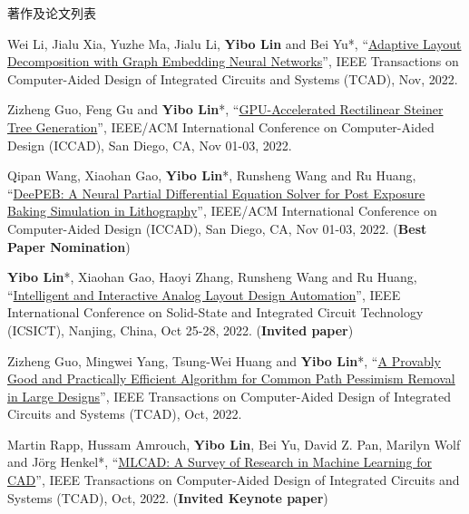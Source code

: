 \begin{rSection}{著作及论文列表}
\begin{description}[font=\normalfont, rightmargin=2em]
{}
            

\item[{[J105]}]{
        Wei Li, Jialu Xia, Yuzhe Ma, Jialu Li, \textbf{Yibo Lin} and Bei Yu*, 
    ``\href{https://doi.org/10.1109/TCAD.2022.3140729}{Adaptive Layout Decomposition with Graph Embedding Neural Networks}'', 
    IEEE Transactions on Computer-Aided Design of Integrated Circuits and Systems (TCAD), Nov, 2022.
    
}
            

\item[{[C104]}]{
        Zizheng Guo, Feng Gu and \textbf{Yibo Lin}*, 
    ``\href{https://doi.org/10.1145/3508352.3549434}{GPU-Accelerated Rectilinear Steiner Tree Generation}'', 
    IEEE/ACM International Conference on Computer-Aided Design (ICCAD), San Diego, CA, Nov 01-03, 2022.
    
}
            

\item[{[C103]}]{
        Qipan Wang, Xiaohan Gao, \textbf{Yibo Lin}*, Runsheng Wang and Ru Huang, 
    ``\href{https://doi.org/10.1145/3508352.3549398}{DeePEB: A Neural Partial Differential Equation Solver for Post Exposure Baking Simulation in Lithography}'', 
    IEEE/ACM International Conference on Computer-Aided Design (ICCAD), San Diego, CA, Nov 01-03, 2022.
    (\textbf{Best Paper Nomination})
}
            

\item[{[C102]}]{
        \textbf{Yibo Lin}*, Xiaohan Gao, Haoyi Zhang, Runsheng Wang and Ru Huang, 
    ``\href{https://doi.org/10.1109/ICSICT55466.2022.9963217}{Intelligent and Interactive Analog Layout Design Automation}'', 
    IEEE International Conference on Solid-State and Integrated Circuit Technology (ICSICT), Nanjing, China, Oct 25-28, 2022.
    (\textbf{Invited paper})
}
            

\item[{[J101]}]{
        Zizheng Guo, Mingwei Yang, Tsung-Wei Huang and \textbf{Yibo Lin}*, 
    ``\href{https://doi.org/10.1109/TCAD.2021.3124758}{A Provably Good and Practically Efficient Algorithm for Common Path Pessimism Removal in Large Designs}'', 
    IEEE Transactions on Computer-Aided Design of Integrated Circuits and Systems (TCAD), Oct, 2022.
    
}
            

\item[{[J100]}]{
        Martin Rapp, Hussam Amrouch, \textbf{Yibo Lin}, Bei Yu, David Z. Pan, Marilyn Wolf and Jörg Henkel*, 
    ``\href{https://doi.org/10.1109/TCAD.2021.3124762}{MLCAD: A Survey of Research in Machine Learning for CAD}'', 
    IEEE Transactions on Computer-Aided Design of Integrated Circuits and Systems (TCAD), Oct, 2022.
    (\textbf{Invited Keynote paper})
}
            


\end{description}
\end{rSection}
